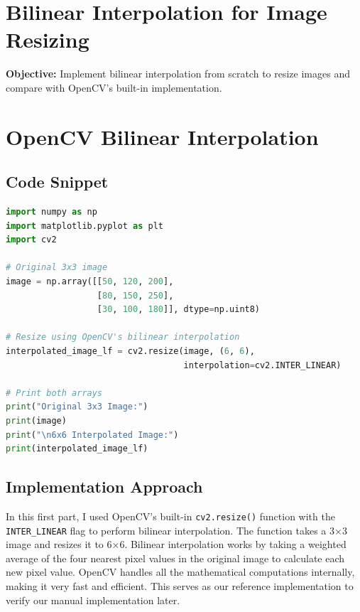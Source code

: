\documentclass[12pt,a4paper]{report}
\begin{document}
\pagestyle{fancy}
\tableofcontents
\newpage

\section*{Bilinear Interpolation for Image Resizing}
\textbf{Objective:} Implement bilinear interpolation from scratch to resize images and compare with OpenCV's built-in implementation.

\vspace{0.5cm}

\setcounter{section}{0}

\section{OpenCV Bilinear Interpolation}

\subsection{Code Snippet}
\begin{lstlisting}[language=Python, caption={Using OpenCV's Built-in Bilinear Interpolation}]
import numpy as np
import matplotlib.pyplot as plt
import cv2

# Original 3x3 image
image = np.array([[50, 120, 200],
                  [80, 150, 250],
                  [30, 100, 180]], dtype=np.uint8)

# Resize using OpenCV's bilinear interpolation
interpolated_image_lf = cv2.resize(image, (6, 6), 
                                   interpolation=cv2.INTER_LINEAR)

# Print both arrays
print("Original 3x3 Image:")
print(image)
print("\n6x6 Interpolated Image:")
print(interpolated_image_lf)
\end{lstlisting}

\subsection{Implementation Approach}
In this first part, I used OpenCV's built-in \texttt{cv2.resize()} function with the \texttt{INTER\_LINEAR} flag to perform bilinear interpolation. The function takes a 3×3 image and resizes it to 6×6. Bilinear interpolation works by taking a weighted average of the four nearest pixel values in the original image to calculate each new pixel value. OpenCV handles all the mathematical computations internally, making it very fast and efficient. This serves as our reference implementation to verify our manual implementation later.
\end{document}
